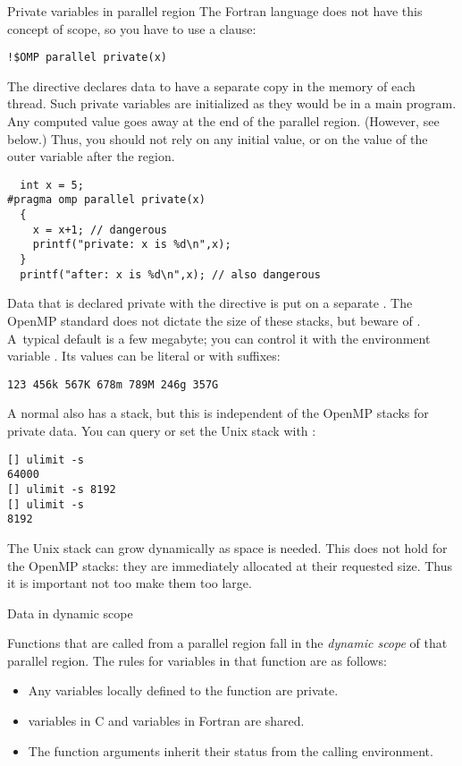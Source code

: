 \begin{fortrannote}{Private variables in parallel region}
  The Fortran language does not have this concept of scope, so you have to use a
   clause:
\begin{lstlisting}
!$OMP parallel private(x)
\end{lstlisting}
\end{fortrannote}

The  directive declares data to have a separate copy 
in the memory of each thread. 
Such private variables are initialized as they would be in a main program.
Any computed value goes away at the end 
of the parallel region. (However, see below.)
Thus, you should not rely on any initial value, or on the value of the outer variable
after the region.

\begin{lstlisting}
  int x = 5;
#pragma omp parallel private(x)
  {
    x = x+1; // dangerous
    printf("private: x is %d\n",x);
  }
  printf("after: x is %d\n",x); // also dangerous
\end{lstlisting}

Data that is declared private with the  directive is
put on a separate . The OpenMP standard
does not dictate the size of these stacks, but beware of .
A~typical default
is a few megabyte; you can control it with the environment variable
. Its values can be literal or with suffixes:
\begin{verbatim}
123 456k 567K 678m 789M 246g 357G
\end{verbatim}

A normal  also has a stack, but this is
independent of the OpenMP stacks for private data. You can query or
set the Unix stack with :
\begin{verbatim}
[] ulimit -s
64000
[] ulimit -s 8192
[] ulimit -s
8192
\end{verbatim}
The Unix stack can grow dynamically as space is needed. This does not
hold for the OpenMP stacks: they are immediately allocated at their
requested size. Thus it is important not too make them too large.

 {Data in dynamic scope}

Functions that are called from a parallel region fall in the
\emph{dynamic scope} of that
parallel region. The rules for variables in that function are as follows:
\begin{itemize}
\item Any variables locally defined to the function are private.
\item {} variables in C and  variables in Fortran
  are shared.
\item The function arguments inherit their status from the calling environment.
\end{itemize}

